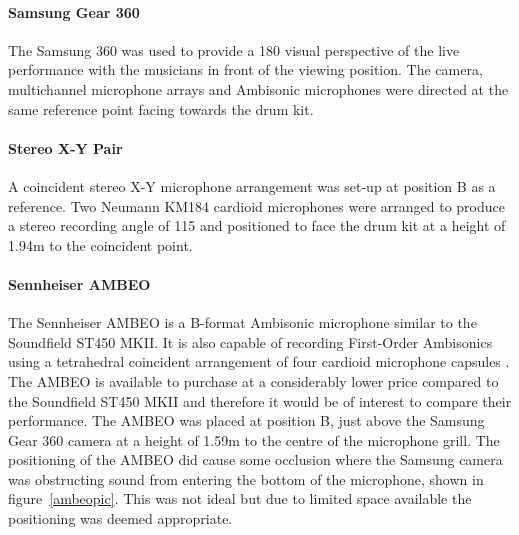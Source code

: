 			\paragraph{Samsung Gear 360}
			The Samsung 360 was used to provide a 180\textdegree{} visual perspective of the live performance with the musicians in front of the viewing position. The camera, multichannel microphone arrays and Ambisonic microphones were directed at the same reference point facing towards the drum kit. \\

			\paragraph{Stereo X-Y Pair}
			A coincident stereo X-Y microphone arrangement was set-up at position B as a reference. Two Neumann KM184 cardioid microphones were arranged to produce a stereo recording angle of 115\textdegree{} and positioned to face the drum kit at a height of 1.94m to the coincident point.\\

			\paragraph{Sennheiser AMBEO}
			The Sennheiser AMBEO is a B-format Ambisonic microphone similar to the Soundfield ST450 MKII. It is also capable of recording First-Order Ambisonics using a tetrahedral coincident arrangement of four cardioid microphone capsules \cite{ambeo}. The AMBEO is available to purchase at a considerably lower price compared to the Soundfield ST450 MKII and therefore it would be of interest to compare their performance. The AMBEO was placed at position B, just above the Samsung Gear 360 camera at a height of 1.59m to the centre of the microphone grill. The positioning of the AMBEO did cause some occlusion where the Samsung camera was obstructing sound from entering the bottom of the microphone, shown in figure~\ref{ambeopic}. This was not ideal but due to limited space available the positioning was deemed appropriate. \\
			
